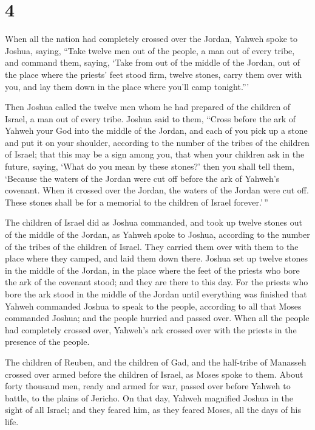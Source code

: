 \hypertarget{section-3}{%
\section{4}\label{section-3}}

 When all the nation had completely crossed over the
Jordan, Yahweh spoke to Joshua, saying,  ``Take twelve men
out of the people, a man out of every tribe,  and command
them, saying, `Take from out of the middle of the Jordan, out of the
place where the priests' feet stood firm, twelve stones, carry them over
with you, and lay them down in the place where you'll camp tonight.'''

 Then Joshua called the twelve men whom he had prepared of
the children of Israel, a man out of every tribe.  Joshua
said to them, ``Cross before the ark of Yahweh your God into the middle
of the Jordan, and each of you pick up a stone and put it on your
shoulder, according to the number of the tribes of the children of
Israel;  that this may be a sign among you, that when your
children ask in the future, saying, `What do you mean by these stones?'
 then you shall tell them, `Because the waters of the
Jordan were cut off before the ark of Yahweh's covenant. When it crossed
over the Jordan, the waters of the Jordan were cut off. These stones
shall be for a memorial to the children of Israel forever.'\,''

 The children of Israel did as Joshua commanded, and took
up twelve stones out of the middle of the Jordan, as Yahweh spoke to
Joshua, according to the number of the tribes of the children of Israel.
They carried them over with them to the place where they camped, and
laid them down there.  Joshua set up twelve stones in the
middle of the Jordan, in the place where the feet of the priests who
bore the ark of the covenant stood; and they are there to this day.
 For the priests who bore the ark stood in the middle of
the Jordan until everything was finished that Yahweh commanded Joshua to
speak to the people, according to all that Moses commanded Joshua; and
the people hurried and passed over.  When all the people
had completely crossed over, Yahweh's ark crossed over with the priests
in the presence of the people.

 The children of Reuben, and the children of Gad, and the
half-tribe of Manasseh crossed over armed before the children of Israel,
as Moses spoke to them.  About forty thousand men, ready
and armed for war, passed over before Yahweh to battle, to the plains of
Jericho.  On that day, Yahweh magnified Joshua in the
sight of all Israel; and they feared him, as they feared Moses, all the
days of his life.

